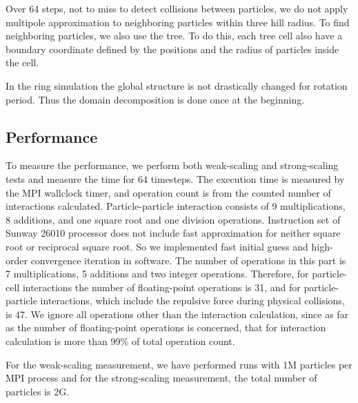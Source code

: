 \documentclass[]{pasj01}
\begin{document}
Over 64 steps, not to miss to detect collisions between particles, we
do not apply multipole approximation to neighboring particles within
three hill radius. To find neighboring particles, we also use the
tree. To do this, each tree cell also have a boundary coordinate
defined by the positions and the radius of particles inside the cell.

In the ring simulation the global structure is not drastically changed
for rotation period. Thus the domain decomposition is done once at the
beginning.

\subsection{Performance}

To measure the performance, we perform both weak-scaling and
strong-scaling tests and measure the time for 64 timesteps. The
execution time is measured by the MPI wallclock timer, and operation
count is from the counted number of interactions
calculated. Particle-particle interaction consists of 9
multiplications, 8 additions, and one square root and one division
operations. Instruction set of Sunway 26010 processor does not include
fast approximation for neither square root or reciprocal square
root. So we implemented fast initial guess and high-order convergence
iteration in software. The number of operations in this part is 7
multiplications, 5 additions and two integer operations. Therefore,
for particle-cell interactions the number of floating-point operations
is 31, and for particle-particle interactions, which include the
repulsive force during physical collisions, is 47. We ignore all
operations other than the interaction calculation, since as far as the
number of floating-point operations is concerned, that for interaction
calculation is more than 99\% of total operation count.

For the weak-scaling measurement, we have performed runs with 1M
particles per MPI process and for the strong-scaling measurement, the
total number of particles is 2G.
\end{document}
